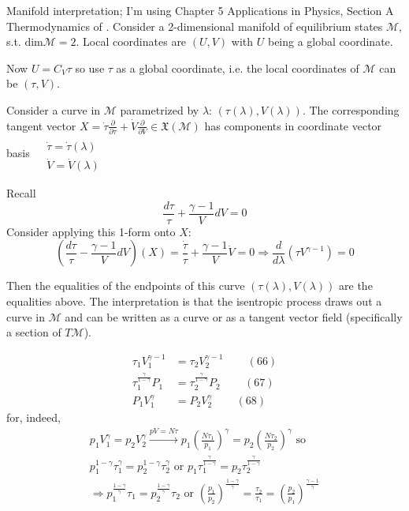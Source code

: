 Manifold interpretation; I'm using Chapter 5 Applications in Physics, Section A Thermodynamics of \cite{BSchutz1980}.  Consider a 2-dimensional manifold of equilibrium states $\mathcal{M}$, s.t. $\text{dim}\mathcal{M} =2$.  Local coordinates are $(U,V)$ with $U$ being a global coordinate.  

Now $U = C_V \tau$ so use $\tau$ as a global coordinate, i.e. the local coordinates of $\mathcal{M}$ can be $(\tau,V)$.  

Consider a curve in $\mathcal{M}$ parametrized by $\lambda$: $(\tau(\lambda), V(\lambda))$.  The corresponding tangent vector $X = \dot{\tau} \frac{ \partial }{ \partial \tau } + \dot{V} \frac{ \partial }{ \partial V} \in \mathfrak{X}(\mathcal{M})$ has components in coordinate vector basis $\begin{aligned} & \quad \\
  & \dot{\tau} = \dot{\tau}(\lambda) \\
  & \dot{V} = \dot{V}(\lambda) \end{aligned}$

Recall
\[
\frac{d\tau}{\tau} + \frac{\gamma- 1}{V} dV =0 
\]
Consider applying this 1-form onto $X$:
\[
\left( \frac{d\tau}{\tau} - \frac{ \gamma - 1}{V}dV \right)(X) = \frac{ \dot{\tau}}{\tau} + \frac{\gamma -1}{ V} \dot{V} = 0 \Longrightarrow \frac{d}{d\lambda}(\tau V^{\gamma-1}) = 0 
\]

Then the equalities of the endpoints of this curve $(\tau(\lambda),V(\lambda))$ are the equalities above.  The interpretation is that the isentropic process draws out a curve in $\mathcal{M}$ and can be written as a curve or as a tangent vector field (specifically a section of $T\mathcal{M}$).  


\begin{align}
  \tau_1 V_1^{\gamma -1 } & = \tau_2 V_2^{\gamma -1 } \quad \quad \, (66) \\
  \tau_1^{ \frac{\gamma}{1-\gamma}} P_1 & = \tau_2^{\frac{\gamma}{1- \gamma}} P_2 \quad \quad \, (67) \\ 
P_1 V_1^{\gamma}   & = P_2 V_2^{\gamma} \quad \quad \, (68)
\end{align}
for, indeed, 
\[
\begin{gathered}
  p_1 V_1^{\gamma} = p_2 V_2^{\gamma} \xrightarrow{ pV=N\tau} p_1 \left( \frac{ N\tau_1}{p_1} \right)^{\gamma} = p_2 \left( \frac{ N\tau_2}{p_2} \right)^{\gamma} \text{ so } \\
  p_1^{1-\gamma} \tau_1^{\gamma} = p_2^{1-\gamma} \tau_2^{\gamma} \text{ or } p_1 \tau_1^{\frac{ \gamma}{1- \gamma} } = p_2 \tau_2^{\frac{ \gamma}{1- \gamma} } \\
\Longrightarrow  p_1^{\frac{1-\gamma}{\gamma} }\tau_1 = p_2^{\frac{1-\gamma}{\gamma} }\tau_2 \text{ or } \left( \frac{p_1}{p_2} \right)^{\frac{1-\gamma}{\gamma} } = \frac{\tau_2}{\tau_1} = \left( \frac{p_2}{p_1} \right)^{\frac{\gamma-1}{\gamma}}
\end{gathered}
\]


